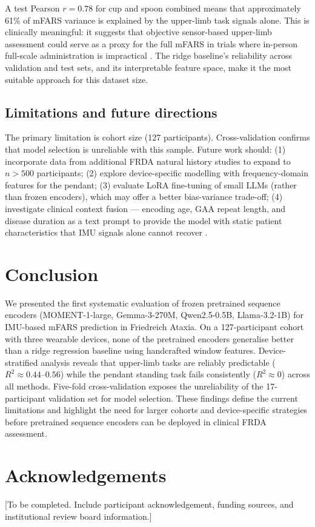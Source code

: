 \documentclass[10pt,twocolumn]{IEEEtran}
\begin{document}
A test Pearson $r = 0.78$ for cup and spoon combined means that
approximately 61\% of mFARS variance is explained by the
upper-limb task signals alone. This is clinically meaningful:
it suggests that objective sensor-based upper-limb assessment
could serve as a proxy for the full mFARS in trials where
in-person full-scale administration is impractical
\cite{Corti2023,Vyas2020}.
The ridge baseline's reliability across validation and test sets,
and its interpretable feature space, make it the most suitable
approach for this dataset size.

\subsection{Limitations and future directions}

The primary limitation is cohort size (127 participants).
Cross-validation confirms that model selection is unreliable
with this sample.
Future work should:
(1) incorporate data from additional FRDA natural history studies
to expand to $n > 500$ participants;
(2) explore device-specific modelling with frequency-domain
features for the pendant;
(3) evaluate LoRA fine-tuning of small LLMs (rather than frozen
encoders), which may offer a better bias-variance trade-off;
(4) investigate clinical context fusion --- encoding age, GAA repeat
length, and disease duration as a text prompt to provide the
model with static patient characteristics that IMU signals
alone cannot recover \cite{Rajpurkar2022,Varoquaux2022}.

\section{Conclusion}

We presented the first systematic evaluation of frozen pretrained
sequence encoders (MOMENT-1-large, Gemma-3-270M, Qwen2.5-0.5B,
Llama-3.2-1B) for IMU-based mFARS prediction in Friedreich Ataxia.
On a 127-participant cohort with three wearable devices, none of the
pretrained encoders generalise better than a ridge regression baseline
using handcrafted window features.
Device-stratified analysis reveals that upper-limb tasks are reliably
predictable ($R^2 \approx 0.44$--$0.56$) while the pendant standing
task fails consistently ($R^2 \approx 0$) across all methods.
Five-fold cross-validation exposes the unreliability of the
17-participant validation set for model selection.
These findings define the current limitations and
highlight the need for larger cohorts and device-specific strategies
before pretrained sequence encoders can be deployed in clinical FRDA
assessment.

\section*{Acknowledgements}
[To be completed. Include participant acknowledgement, funding sources,
and institutional review board information.]



\end{document}
